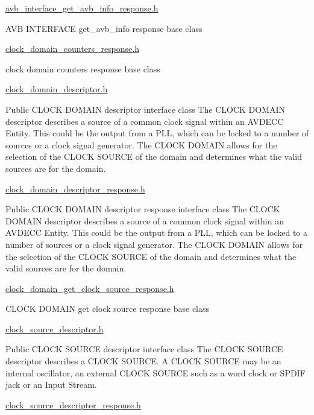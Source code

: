 \hyperlink{avb__interface__get__avb__info__response_8h}{avb\+\_\+interface\+\_\+get\+\_\+avb\+\_\+info\+\_\+response.\+h}

A\+VB I\+N\+T\+E\+R\+F\+A\+CE get\+\_\+avb\+\_\+info response base class

\hyperlink{clock__domain__counters__response_8h}{clock\+\_\+domain\+\_\+counters\+\_\+response.\+h}

clock domain counters response base class

\hyperlink{clock__domain__descriptor_8h}{clock\+\_\+domain\+\_\+descriptor.\+h}

Public C\+L\+O\+CK D\+O\+M\+A\+IN descriptor interface class The C\+L\+O\+CK D\+O\+M\+A\+IN descriptor describes a source of a common clock signal within an A\+V\+D\+E\+CC Entity. This could be the output from a P\+LL, which can be locked to a number of sources or a clock signal generator. The C\+L\+O\+CK D\+O\+M\+A\+IN allows for the selection of the C\+L\+O\+CK S\+O\+U\+R\+CE of the domain and determines what the valid sources are for the domain.

\hyperlink{clock__domain__descriptor__response_8h}{clock\+\_\+domain\+\_\+descriptor\+\_\+response.\+h}

Public C\+L\+O\+CK D\+O\+M\+A\+IN descriptor response interface class The C\+L\+O\+CK D\+O\+M\+A\+IN descriptor describes a source of a common clock signal within an A\+V\+D\+E\+CC Entity. This could be the output from a P\+LL, which can be locked to a number of sources or a clock signal generator. The C\+L\+O\+CK D\+O\+M\+A\+IN allows for the selection of the C\+L\+O\+CK S\+O\+U\+R\+CE of the domain and determines what the valid sources are for the domain.

\hyperlink{clock__domain__get__clock__source__response_8h}{clock\+\_\+domain\+\_\+get\+\_\+clock\+\_\+source\+\_\+response.\+h}

C\+L\+O\+CK D\+O\+M\+A\+IN get clock source response base class

\hyperlink{clock__source__descriptor_8h}{clock\+\_\+source\+\_\+descriptor.\+h}

Public C\+L\+O\+CK S\+O\+U\+R\+CE descriptor interface class The C\+L\+O\+CK S\+O\+U\+R\+CE descriptor describes a C\+L\+O\+CK S\+O\+U\+R\+CE. A C\+L\+O\+CK S\+O\+U\+R\+CE may be an internal oscillator, an external C\+L\+O\+CK S\+O\+U\+R\+CE such as a word clock or S\+P\+D\+IF jack or an Input Stream.

\hyperlink{clock__source__descriptor__response_8h}{clock\+\_\+source\+\_\+descriptor\+\_\+response.\+h}

